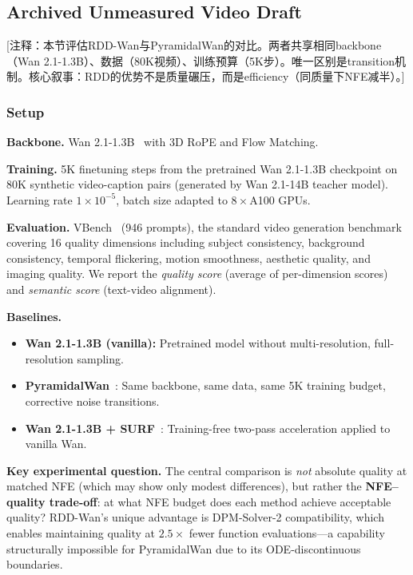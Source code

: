 \documentclass[10pt]{article}
\begin{document}
\subsection{Archived Unmeasured Video Draft}

\textcolor{green!50!black}{[注释：本节评估RDD-Wan与PyramidalWan的对比。两者共享相同backbone（Wan 2.1-1.3B）、数据（80K视频）、训练预算（5K步）。唯一区别是transition机制。核心叙事：RDD的优势不是质量碾压，而是efficiency（同质量下NFE减半）。]}

\subsubsection{Setup}

\textbf{Backbone.} Wan 2.1-1.3B~\citep{wan2025wan} with 3D RoPE and Flow Matching.

\textbf{Training.} 5K finetuning steps from the pretrained Wan 2.1-1.3B checkpoint on 80K synthetic video-caption pairs (generated by Wan 2.1-14B teacher model).
Learning rate $1 \times 10^{-5}$, batch size adapted to $8\times$A100 GPUs.

\textbf{Evaluation.} VBench~\citep{huang2024vbench} (946 prompts), the standard video generation benchmark covering 16 quality dimensions including subject consistency, background consistency, temporal flickering, motion smoothness, aesthetic quality, and imaging quality.
We report the \emph{quality score} (average of per-dimension scores) and \emph{semantic score} (text-video alignment).

\textbf{Baselines.}
\begin{itemize}
    \item \textbf{Wan 2.1-1.3B (vanilla):} Pretrained model without multi-resolution, full-resolution sampling.
    \item \textbf{PyramidalWan}~\citep{liu2025pyramidalwan}: Same backbone, same data, same 5K training budget, corrective noise transitions.
    \item \textbf{Wan 2.1-1.3B + SURF}~\citep{xu2026surf}: Training-free two-pass acceleration applied to vanilla Wan.
\end{itemize}

\textbf{Key experimental question.} The central comparison is \emph{not} absolute quality at matched NFE (which may show only modest differences), but rather the \textbf{NFE--quality trade-off}: at what NFE budget does each method achieve acceptable quality? RDD-Wan's unique advantage is DPM-Solver-2 compatibility, which enables maintaining quality at $2.5\times$ fewer function evaluations---a capability structurally impossible for PyramidalWan due to its ODE-discontinuous boundaries.
\end{document}
